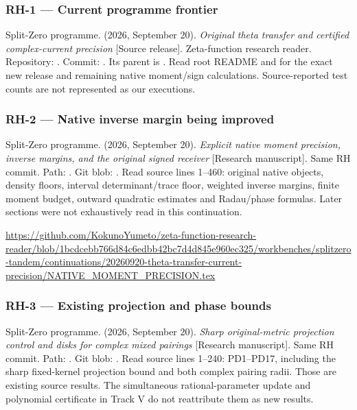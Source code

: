 \subsubsection{RH-1 --- Current programme
frontier}\label{rh-1-current-programme-frontier}

Split-Zero programme. (2026, September 20). \emph{Original theta
transfer and certified complex-current precision} {[}Source release{]}.
Zeta-function research reader. Repository:
. Commit:
. Its parent is
. Read root README and
for the exact new release and remaining native moment/sign calculations.
Source-reported test counts are not represented as our executions.

\subsubsection{RH-2 --- Native inverse margin being
improved}\label{rh-2-native-inverse-margin-being-improved}

Split-Zero programme. (2026, September 20). \emph{Explicit native moment
precision, inverse margins, and the original signed receiver}
{[}Research manuscript{]}. Same RH commit. Path:
.
Git blob: . Read source
lines 1--460: original native objects, density floors, interval
determinant/trace floor, weighted inverse margins, finite moment budget,
outward quadratic estimates and Radau/phase formulas. Later sections
were not exhaustively read in this continuation.

\url{https://github.com/KokunoYumeto/zeta-function-research-reader/blob/1bcdcebb766d84c6edbb42bc7d4d845e960ec325/workbenches/splitzero-tandem/continuations/20260920-theta-transfer-current-precision/NATIVE_MOMENT_PRECISION.tex}

\subsubsection{RH-3 --- Existing projection and phase
bounds}\label{rh-3-existing-projection-and-phase-bounds}

Split-Zero programme. (2026, September 20). \emph{Sharp original-metric
projection control and disks for complex mixed pairings} {[}Research
manuscript{]}. Same RH commit. Path:
.
Git blob: . Read source
lines 1--240: PD1--PD17, including the sharp fixed-kernel projection
bound and both complex pairing radii. Those are existing source results.
The simultaneous rational-parameter update and polynomial certificate in
Track V do not reattribute them as new results.

